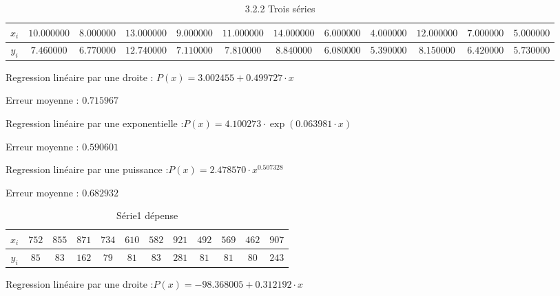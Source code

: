 \documentclass{report}
\begin{document}
      \newpage
	   \begin{table}[h]
	\centering
		\begin{tabular}{| c | c | c | c | c | c | c | c | c | c | c | c |}
		\hline 
		$x_{i}$ & $10.000000$ & $8.000000$ & $13.000000$ & $9.000000$ & $11.000000$ & $14.000000$ & $6.000000$ & $4.000000$ & $12.000000$ & $7.000000$ & $5.000000$ \\ 
		\hline 
		$y_{i}$ & $7.460000$ & $6.770000$ & $12.740000$ & $7.110000$ & $7.810000$ & $8.840000$ & $6.080000$ & $5.390000$ & $8.150000$ & $6.420000$ & $5.730000$ \\ 
		\hline 
		\end{tabular}
	\caption{3.2.2 Trois séries}
	\label{Jeux d'essais interpolation 3.2.2}
		\end{table}
	Regression linéaire par une droite : $P(x) = 3.002455 + 0.499727 \cdot x$
	
	Erreur moyenne : $0.715967$
	
	Regression linéaire par une exponentielle :$P(x) = 4.100273 \cdot \exp(0.063981 \cdot x)$
	
	Erreur moyenne : $0.590601$
	
	Regression linéaire par une puissance :$P(x) = 2.478570 \cdot x^{0.507328}$
	
	Erreur moyenne : $0.682932$
		
      \newpage
     \begin{table}[h]
	\centering
	\begin{tabular}{| c | c | c | c | c | c | c | c | c | c | c | c |}
	  \hline 
	  $x_{i}$ & $752$ & $855$ & $871$ & $734$ & $610$ & $582$ & $921$ & $492$ & $569$ & $462$ & $907 $ \\ 
	  \hline 
	  $y_{i}$ & $85$ & $83$ & $162$ & $79$ & $81$ & $83$ & $281$ & $81$ & $81$ & $80$ & $243 $ \\ 
	  \hline 
	\end{tabular}
	\caption{Série1 dépense}
	\label{Jeux d'essais approximation 3.3 Série 1}
      \end{table}
	Regression linéaire par une droite :$ P(x) =  - 98.368005 + 0.312192 \cdot x$
	
\end{document}
